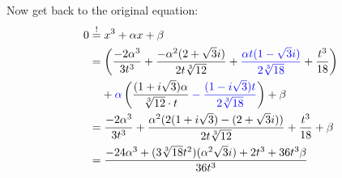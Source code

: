 Now get back to the original equation:
\begin{align}
    0 &\stackrel{!}{=} x^3 + \alpha x + \beta \\
       &= \left (\frac{-2 \alpha^3}{3 t^3}
        + \frac{-\alpha^2(2+\sqrt{3}i)}{2t\sqrt[3]{12}}
        + \color{blue}\frac{\alpha t(1-\sqrt{3}i)}{2\sqrt[3]{18}}\color{black}
        + \frac{t^3}{18} \right )\\
    &\hphantom{{}=} + \color{blue}\alpha\color{black} \left (\frac{(1+i \sqrt{3})\alpha}{\sqrt[3]{12} \cdot t}
     \color{blue}-\frac{(1-i\sqrt{3}) t}{2\sqrt[3]{18}} \color{black} \right ) + \beta\\
    &= \frac{-2 \alpha^3}{3 t^3}
    + \frac{\alpha^2(2(1+i\sqrt{3})-(2+\sqrt{3}i))}{2t\sqrt[3]{12}}
    + \frac{t^3}{18}
    + \beta\\
    &= \frac{-24 \alpha^3 + (3\sqrt[3]{18}t^2)(\alpha^2\sqrt{3}i) + 2t^3+36 t^3 \beta}{36t^3}
\end{align}
